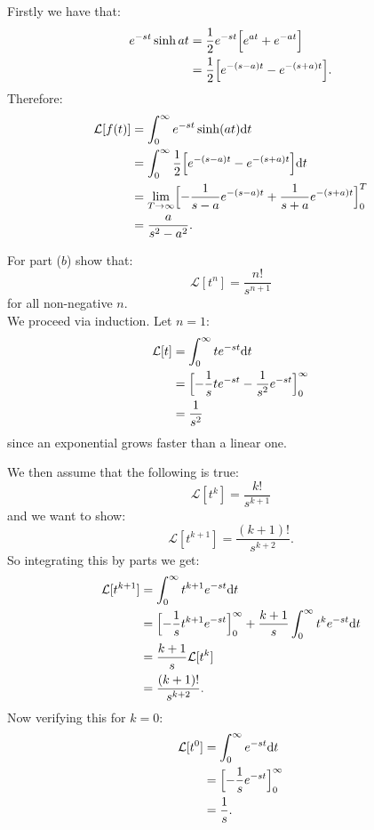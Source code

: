 \begin{enumerate}
    Firstly we have that:
    \begin{align*}
        e^{-st}\sinh at
        &=\frac{1}{2}e^{-st}
        \Bigl[e^{at}+e^{-at}\Bigr] \\
        &=\frac{1}{2}
        \Bigl[e^{-(s-a)t}
        -e^{-(s+a)t}\Bigr].
    \end{align*}
    Therefore:
    \begin{align*}
        \mathcal{L}[f(t)]
        &=\int_{0}^{\infty}e^{-st}
        \sinh(at)\dd t \\
        &=\int_{0}^{\infty}
        \frac{1}{2}
        \Bigl[e^{-(s-a)t}
        -e^{-(s+a)t}\Bigr]\dd t \\
        &=\lim_{T\rightarrow\infty}
        \Bigl[-\frac{1}{s-a}e^{-(s-a)t}
        +\frac{1}{s+a}e^{-(s+a)t}\Bigr]_{0}^{T} \\
        &=\frac{a}{s^2-a^2}. \\
    \end{align*}

    For part ($b$) show that:
    $$\mathcal{L}[t^n]=\frac{n!}{s^{n+1}}$$
    for all non-negative $n$. \\

    We proceed via induction. Let $n=1$:
    \begin{align*}
        \mathcal{L}[t]
        &=\int_{0}^{\infty}t e^{-st}\dd t \\
        &=\Bigl[-\frac{1}{s}te^{-st}
        -\frac{1}{s^2}e^{-st}\Bigr]_{0}^{\infty} \\
        &=\frac{1}{s^2}
    \end{align*}
    since an exponential grows faster than a linear one.

    \newpage

    We then assume that the following is true:
    $$\mathcal{L}[t^k]=\frac{k!}{s^{k+1}}$$
    and we want to show:
    $$\mathcal{L}[t^{k+1}]=\frac{(k+1)!}{s^{k+2}}.$$
    So integrating this by parts we get:
    \begin{align*}
        \mathcal{L}[t^{k+1}]
        &=\int_{0}^{\infty}t^{k+1}e^{-st}\dd t \\
        &=\Bigl[-\frac{1}{s}t^{k+1}e^{-st}\Bigr]_{0}^{\infty}
        +\frac{k+1}{s}\int_{0}^{\infty}t^k e^{-st}\dd t \\
        &=\frac{k+1}{s}\mathcal{L}[t^k] \\
        &=\frac{(k+1)!}{s^{k+2}}.
    \end{align*}
    Now verifying this for $k=0$:
    \begin{align*}
        \mathcal{L}[t^0]
        &=\int_{0}^{\infty}e^{-st}\dd t \\
        &=\Bigl[-\frac{1}{s}e^{-st}\Bigr]_{0}^{\infty} \\
        &=\frac{1}{s}. \\
    \end{align*}


\end{enumerate}
